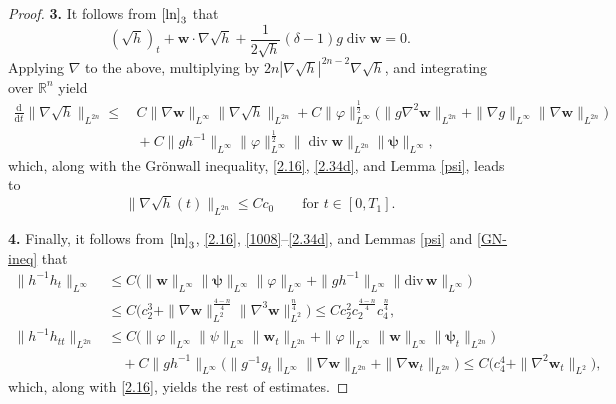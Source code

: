\documentclass[11pt,reqno]{amsart}
\DeclareMathOperator{\diver}{\mathrm{div}}
\numberwithin{rk}{section}
\numberwithin{prop}{section}
\numberwithin{mydef}{section}
\numberwithin{lem}{section}
\numberwithin{equation}{section}
\numberwithin{thm}{section}
\begin{document}
\begin{proof}
\smallskip
\textbf{3.} It follows from  $\eqref{ln}_3$ that 
\begin{equation*} 
(\sqrt{h})_t+\boldsymbol{w}\cdot\nabla\sqrt{h}+\frac{1}{2\sqrt{h}}(\delta-1)g\diver\boldsymbol{w}=0.
\end{equation*}
Applying  $\nabla$ to the above,
multiplying  by $2n|\nabla\sqrt{h}|^{2n-2}\nabla\sqrt{h}$, 
and  integrating  over $\mathbb{R}^n$ yield
\begin{equation*}
\begin{aligned}
\frac{\mathrm{d}}{\mathrm{d}t}\|\nabla\sqrt{h}\|_{L^{2n}} 
\leq&\, C\|\nabla \boldsymbol{w}\|_{L^\infty}\|\nabla\sqrt{h}\|_{L^{2n}}+C\big \|\varphi\|^{\frac{1}{2}}_{L^\infty}\big(\|g\nabla^2\boldsymbol{w}\|_{L^{2n}}+\|\nabla g\|_{L^\infty}\|\nabla \boldsymbol{w}\|_{L^{2n}}\big) \\
&\, +C\|gh^{-1}\|_{L^\infty}\|\varphi\|^{\frac{1}{2}}_{L^\infty}\|\diver\boldsymbol{w}\|_{L^{2n}}\|\boldsymbol{\psi}\|_{L^\infty} ,
\end{aligned}
\end{equation*}
which, along with the Gr\"onwall inequality, \eqref{2.16}, \eqref{2.34d}, and Lemma \ref{psi},  leads to 
\begin{equation*} 
\|\nabla\sqrt{h}(t)\|_{L^{2n}}\leq Cc_0\qquad \text{for $t\in [0,T_1]$}.
\end{equation*}

\smallskip
\textbf{4.}
Finally, it follows from $\eqref{ln}_3$, \eqref{2.16}, \eqref{1008}--\eqref{2.34d}, and Lemmas \ref{psi} and \ref{GN-ineq} that
\begin{equation*} 
\begin{aligned}
\|h^{-1}h_t\|_{L^\infty}&\leq  C\big(\|\boldsymbol{w}\|_{L^\infty}\|\boldsymbol{\psi}\|_{L^\infty}\|\varphi\|_{L^\infty}+\|gh^{-1}\|_{L^\infty}\|\mathrm{div}\,\boldsymbol{w}\|_{L^\infty}\big)\\
&\leq C\big(c^3_2+\|\nabla \boldsymbol{w}\|^{\frac{4-n}{4}}_{L^2}\|\nabla^3\boldsymbol{w}\|^{\frac{n}{4}}_{L^2}\big)\leq Cc^2_2c^{\frac{4-n}{4}}_2c^{\frac{n}{4}}_4,\\
\|h^{-1}h_{tt}\|_{L^{2n}}&\leq C\big(\|\varphi\|_{L^\infty}\|\psi\|_{L^\infty}\| \boldsymbol{w}_t\|_{L^{2n}}+\|\varphi\|_{L^\infty}\|\boldsymbol{w}\|_{L^\infty}\| \boldsymbol{\psi}_t\|_{L^{2n}}\big)\\
&\quad +C\|gh^{-1}\|_{L^\infty}\big(\|g^{-1}g_t\|_{L^\infty}\| \nabla \boldsymbol{w}\|_{L^{2n}}+ \| \nabla \boldsymbol{w}_t\|_{L^{2n}}\big) \leq C\big(c^4_4+\| \nabla^2 \boldsymbol{w}_t\|_{L^2}\big),
\end{aligned}
\end{equation*}
which, along with \eqref{2.16}, yields the rest of estimates.
\end{proof} 
\end{document}
